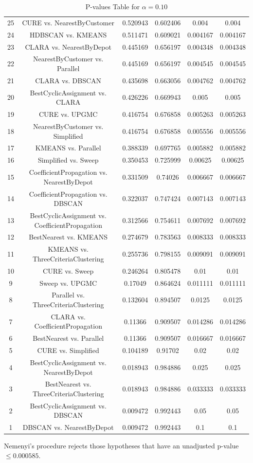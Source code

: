 \documentclass[a4paper,10pt]{article}
\begin{document}
\begin{landscape}
\begin{table}[!htp]
\begin{tabular}{cccccc}
25&CURE vs. NearestByCustomer&0.520943&0.602406&0.004&0.004\\
24&HDBSCAN vs. KMEANS&0.511471&0.609021&0.004167&0.004167\\
23&CLARA vs. NearestByDepot&0.445169&0.656197&0.004348&0.004348\\
22&NearestByCustomer vs. Parallel&0.445169&0.656197&0.004545&0.004545\\
21&CLARA vs. DBSCAN&0.435698&0.663056&0.004762&0.004762\\
20&BestCyclicAssignment vs. CLARA&0.426226&0.669943&0.005&0.005\\
19&CURE vs. UPGMC&0.416754&0.676858&0.005263&0.005263\\
18&NearestByCustomer vs. Simplified&0.416754&0.676858&0.005556&0.005556\\
17&KMEANS vs. Parallel&0.388339&0.697765&0.005882&0.005882\\
16&Simplified vs. Sweep&0.350453&0.725999&0.00625&0.00625\\
15&CoefficientPropagation vs. NearestByDepot&0.331509&0.74026&0.006667&0.006667\\
14&CoefficientPropagation vs. DBSCAN&0.322037&0.747424&0.007143&0.007143\\
13&BestCyclicAssignment vs. CoefficientPropagation&0.312566&0.754611&0.007692&0.007692\\
12&BestNearest vs. KMEANS&0.274679&0.783563&0.008333&0.008333\\
11&KMEANS vs. ThreeCriteriaClustering&0.255736&0.798155&0.009091&0.009091\\
10&CURE vs. Sweep&0.246264&0.805478&0.01&0.01\\
9&Sweep vs. UPGMC&0.17049&0.864624&0.011111&0.011111\\
8&Parallel vs. ThreeCriteriaClustering&0.132604&0.894507&0.0125&0.0125\\
7&CLARA vs. CoefficientPropagation&0.11366&0.909507&0.014286&0.014286\\
6&BestNearest vs. Parallel&0.11366&0.909507&0.016667&0.016667\\
5&CURE vs. Simplified&0.104189&0.91702&0.02&0.02\\
4&BestCyclicAssignment vs. NearestByDepot&0.018943&0.984886&0.025&0.025\\
3&BestNearest vs. ThreeCriteriaClustering&0.018943&0.984886&0.033333&0.033333\\
2&BestCyclicAssignment vs. DBSCAN&0.009472&0.992443&0.05&0.05\\
1&DBSCAN vs. NearestByDepot&0.009472&0.992443&0.1&0.1\\
\hline
\end{tabular}
\caption{P-values Table for $\alpha=0.10$}
\end{table}Nemenyi's procedure rejects those hypotheses that have an unadjusted p-value $\le0.000585$.


\end{landscape}
\end{document}
